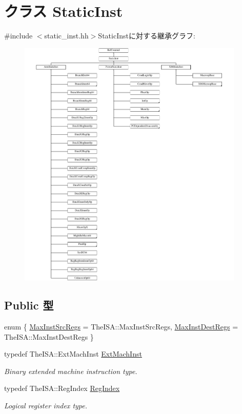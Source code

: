 \hypertarget{classStaticInst}{
\section{クラス StaticInst}
\label{classStaticInst}
}


{\ttfamily \#include $<$static\_\-inst.hh$>$}StaticInstに対する継承グラフ:\begin{figure}[H]
\begin{center}
\leavevmode
\includegraphics[height=12cm]{classStaticInst}
\end{center}
\end{figure}
\subsection*{Public 型}
\begin{DoxyCompactItemize}
\item 
enum \{ \hyperlink{classStaticInst_a16685eea158879e41b101ca3634de462a17b78fe104e3bf28fca535a040514084}{MaxInstSrcRegs} =  TheISA::MaxInstSrcRegs, 
\hyperlink{classStaticInst_a16685eea158879e41b101ca3634de462a6a2e9b17a83d01eb4ee6bbdd739be9eb}{MaxInstDestRegs} =  TheISA::MaxInstDestRegs
 \}
\item 
typedef TheISA::ExtMachInst \hyperlink{classStaticInst_a5605d4fc727eae9e595325c90c0ec108}{ExtMachInst}
\begin{DoxyCompactList}\small\item\em Binary extended machine instruction type. \item\end{DoxyCompactList}\item 
typedef TheISA::RegIndex \hyperlink{classStaticInst_a36d25e03e43fa3bb4c5482cbefe5e0fb}{RegIndex}
\begin{DoxyCompactList}\small\item\em Logical register index type. \item\end{DoxyCompactList}\end{DoxyCompactItemize}
